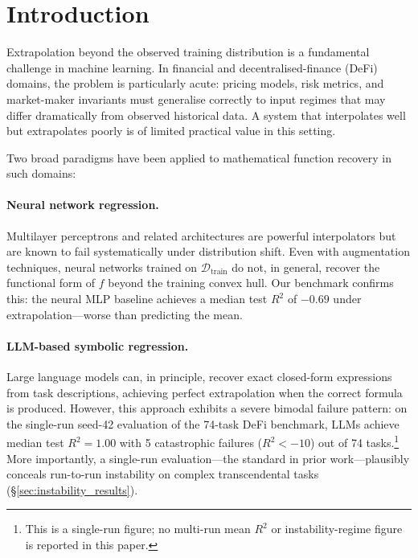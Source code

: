 \documentclass[twoside,11pt]{article}
\newcommand{\Rsq}{R^{2}}
\begin{document}
\section{Introduction}
\label{sec:intro}

Extrapolation beyond the observed training distribution is a fundamental challenge
in machine learning.  In financial and decentralised-finance (DeFi) domains, the
problem is particularly acute: pricing models, risk metrics, and market-maker
invariants must generalise correctly to input regimes that may differ dramatically
from observed historical data.  A system that interpolates well but extrapolates
poorly is of limited practical value in this setting.

Two broad paradigms have been applied to mathematical function recovery in such
domains:

\paragraph{Neural network regression.}
Multilayer perceptrons and related architectures are powerful interpolators but
are known to fail systematically under distribution shift.  Even with augmentation
techniques, neural networks trained on $\mathcal{D}_{\mathrm{train}}$ do not, in
general, recover the functional form of $f$ beyond the training convex hull.  Our
benchmark confirms this: the neural MLP baseline achieves a median test $\Rsq$ of
$-0.69$ under extrapolation---worse than predicting the mean.

\paragraph{LLM-based symbolic regression.}
Large language models can, in principle, recover exact closed-form expressions from
task descriptions, achieving perfect extrapolation when the correct formula is
produced.  However, this approach exhibits a severe bimodal failure pattern: on
the single-run seed-42 evaluation of the 74-task DeFi benchmark, LLMs achieve
median test $\Rsq=1.00$ with 5 catastrophic failures ($\Rsq < -10$) out of 74
tasks.\footnote{This is a single-run figure; no multi-run mean $\Rsq$ or
instability-regime figure is reported in this paper.} More importantly, a single-run evaluation---the
standard in prior work---plausibly conceals run-to-run instability on complex
transcendental tasks (\S\ref{sec:instability_results}).
\end{document}
